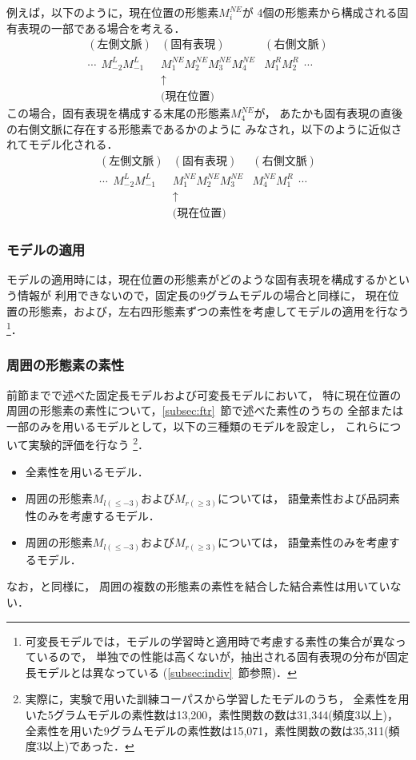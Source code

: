 \clearpage
例えば，以下のように，現在位置の形態素$M_{i}^{NE}$が
4個の形態素から構成される固有表現の一部である場合を考える．
\begin{eqnarray*}
(左側文脈) & (固有表現)  & (右側文脈)  \\
\cdots\ \  M_{-2}^L M_{-1}^L & 
        M_{1}^{NE}M_{2}^{NE}M_{3}^{NE}M_{4}^{NE}
        & M_{1}^R M_{2}^R\ \ \cdots  \\ 
        & \uparrow\ \ \ \ \ \ \ \ \ \  & \\
        & \mbox{(現在位置)}\ \ \ \ \ \ \ \ \   & 
\end{eqnarray*}
この場合，固有表現を構成する末尾の形態素$M_{4}^{NE}$が，
あたかも固有表現の直後の右側文脈に存在する形態素であるかのように
みなされ，以下のように近似されてモデル化される．
\begin{eqnarray*}
(左側文脈) & (固有表現)  & (右側文脈)  \nonumber \\
\cdots\ \  M_{-2}^L M_{-1}^L & 
        M_{1}^{NE}M_{2}^{NE}M_{3}^{NE}
        & M_{4}^{NE}M_{1}^R \ \ \cdots  \\
        & \uparrow\ \ \  & \\
        & \mbox{(現在位置)}\ \ \ & \nonumber
\end{eqnarray*}

\subsubsection*{モデルの適用}

モデルの適用時には，現在位置の形態素がどのような固有表現を構成するかという情報が
利用できないので，固定長の9グラムモデルの場合と同様に，
現在位置の形態素，および，左右四形態素ずつの素性を考慮してモデルの適用を行なう
\footnote{
  可変長モデルでは，モデルの学習時と適用時で考慮する素性の集合が異なっているので，
  単独での性能は高くないが，抽出される固有表現の分布が固定長モデルとは異なっている
  (\ref{subsec:indiv}~節参照)．
}．

\subsubsection{周囲の形態素の素性}
\label{subsubsec:ftr34}

前節までで述べた固定長モデルおよび可変長モデルにおいて，
特に現在位置の周囲の形態素の素性について，\ref{subsec:ftr}~節で述べた素性のうちの
全部または一部のみを用いるモデルとして，以下の三種類のモデルを設定し，
これらについて実験的評価を行なう
\footnote{
  実際に，実験で用いた訓練コーパスから学習したモデルのうち，
  全素性を用いた5グラムモデルの素性数は13,200，素性関数の数は31,344(頻度3以上)，
  全素性を用いた9グラムモデルの素性数は15,071，素性関数の数は35,311(頻度3以上)であった．
}．
\begin{itemize}
\item 全素性を用いるモデル．
\item 周囲の形態素$M_{l(\leq -3)}$および$M_{r(\geq 3)}$については，
	語彙素性および品詞素性のみを考慮するモデル．
\item 周囲の形態素$M_{l(\leq -3)}$および$M_{r(\geq 3)}$については，
	語彙素性のみを考慮するモデル．
\end{itemize}
なお，\cite{Uchimoto00aj}と同様に，
周囲の複数の形態素の素性を結合した結合素性は用いていない．

